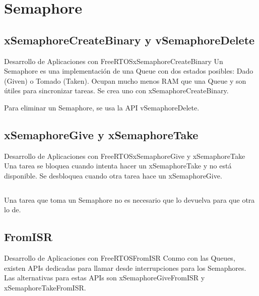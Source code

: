 \documentclass[aspectratio=169, xcolor=dvipsnames]{beamer}
\begin{document}
\section{Semaphore}
\subsection{xSemaphoreCreateBinary y vSemaphoreDelete}
\begin{frame}{Desarrollo de Aplicaciones con FreeRTOS}{xSemaphoreCreateBinary}
Un Semaphore es una implementación de una Queue con dos estados posibles: Dado (Given) o Tomado (Taken).\newline
Ocupan mucho menos RAM que una Queue y son útiles para sincronizar tareas. Se crea uno con \textcolor{myblue}{xSemaphoreCreateBinary}.\newline

Para eliminar un Semaphore, se usa la API \textcolor{myblue}{vSemaphoreDelete}.\newline

\end{frame}

\subsection{xSemaphoreGive y xSemaphoreTake}
\begin{frame}{Desarrollo de Aplicaciones con FreeRTOS}{xSemaphoreGive y xSemaphoreTake}
Una tarea se bloquea cuando intenta hacer un \textcolor{myblue}{xSemaphoreTake} y no está disponible. Se desbloquea cuando otra tarea hace un \textcolor{myblue}{xSemaphoreGive}.\newline
\begin{columns}
\begin{column}{0.5\textwidth}

\end{column}
\begin{column}{0.5\textwidth}

\end{column}
\end{columns}
Una tarea que toma un Semaphore no es necesario que lo devuelva para que otra lo de.
\end{frame}

\subsection{FromISR}
\begin{frame}{Desarrollo de Aplicaciones con FreeRTOS}{FromISR}
Conmo con las Queues, existen APIs dedicadas para llamar desde interrupciones para los Semaphores.\newline
Las alternativas para estas APIs son \textcolor{myblue}{xSemaphoreGiveFromISR} y \textcolor{myblue}{xSemaphoreTakeFromISR}.\newline

\end{frame}
\end{document}
